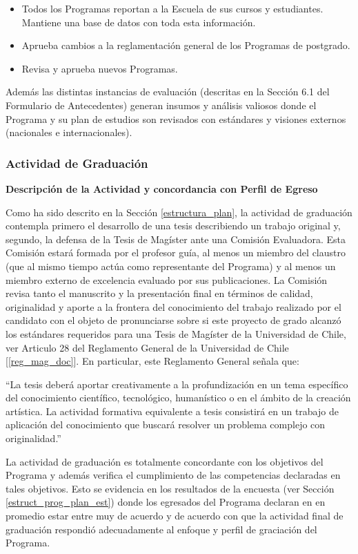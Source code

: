 \begin{enumerate}
\begin{itemize}
\item Todos los Programas reportan a la Escuela de sus cursos y estudiantes. Mantiene una
base de datos con toda esta información.
\item Aprueba cambios a la reglamentación general de los Programas de postgrado.
\item Revisa y aprueba nuevos Programas.
\end{itemize}

Además las distintas instancias de evaluación (descritas en la Sección 6.1 del Formulario de
Antecedentes) generan insumos y análisis valiosos donde el Programa y su plan de estudios son
revisados con estándares y visiones externos (nacionales e internacionales).
\end{enumerate}

\subsubsection{Actividad de Graduación}

\noindent\textbf{Descripción de la Actividad y concordancia con Perfil de Egreso}

Como ha sido descrito
en la Sección \ref{estructura_plan}, la actividad de graduación contempla primero el desarrollo de una tesis
describiendo un trabajo original y, segundo, la defensa de la Tesis de Magíster ante una Comisión
Evaluadora. Esta Comisión estará formada por el profesor guía, al menos un miembro del claustro
(que al mismo tiempo actúa como representante del Programa) y al menos un miembro externo
de excelencia evaluado por sus publicaciones. La Comisión revisa tanto el manuscrito y la
presentación final en términos de calidad, originalidad y aporte a la frontera del conocimiento del
trabajo realizado por el candidato con el objeto de pronunciarse sobre si este proyecto de grado alcanzó
los estándares requeridos para una Tesis de Magíster de la Universidad de Chile, ver Articulo 28
del Reglamento General de la Universidad de Chile [\ref{reg_mag_doc}]. En particular, este Reglamento General
señala que:

``La tesis deberá aportar creativamente a la profundización en un tema específico del
conocimiento científico, tecnológico, humanístico o en el ámbito de la creación artística. La
actividad formativa equivalente a tesis consistirá en un trabajo de aplicación del conocimiento
que buscará resolver un problema complejo con originalidad.''

La actividad de graduación es totalmente concordante con los objetivos del Programa y además
verifica el cumplimiento de las competencias declaradas en tales objetivos. Esto se evidencia en
los resultados de la encuesta (ver Sección \ref{estruct_prog_plan_est}) donde los egresados del Programa declaran en
en promedio estar entre muy de acuerdo y de acuerdo con que la actividad final de graduación respondió
adecuadamente al enfoque y perfil de graciación del Programa. 

